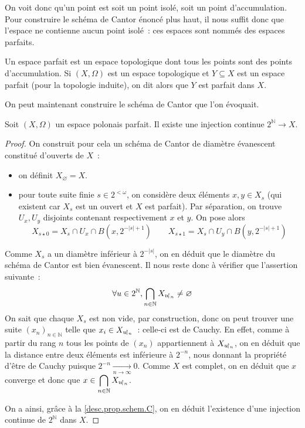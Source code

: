 On voit donc qu'un point est soit un point isolé, soit un point d'accumulation.
Pour construire le schéma de Cantor énoncé plus haut, il nous suffit donc
que l'espace ne contienne aucun point isolé~: ces espaces sont nommés des
espaces parfaits.

\begin{definition}
  Un espace parfait est un espace topologique dont tous les points sont des
  points d'accumulation. Si $(X,\Omega)$ est un espace topologique et
  $Y\subseteq X$ est un espace parfait (pour la topologie induite), on dit alors
  que $Y$ est parfait dans $X$.
\end{definition}

On peut maintenant construire le schéma de Cantor que l'on évoquait.

\begin{proposition}
  Soit $(X,\Omega)$ un espace polonais parfait. Il existe une injection continue
  $2^{\mathbb N} \to X$.
\end{proposition}

\begin{proof}
  On construit pour cela un schéma de Cantor de diamètre évanescent constitué
  d'ouverts de $X$~:
  \begin{itemize}
  \item on définit $X_\varnothing = X$.
  \item pour toute suite finie $s\in 2^{<\omega}$, on considère deux éléments
    $x,y\in X_s$ (qui existent car $X_s$ est un ouvert et $X$ est parfait). Par
    séparation, on trouve $U_x,U_y$ disjoints contenant respectivement $x$ et
    $y$. On pose alors
    \[X_{s\star 0} = X_s\cap U_x \cap B(x,2^{-|s|+1})\qquad
    X_{s\star 1} = X_s\cap U_y \cap B(y,2^{-|s|+1})\]
  \end{itemize}
  Comme $X_s$ a un diamètre inférieur à $2^{-|s|}$, on en déduit que le diamètre
  du schéma de Cantor est bien évanescent. Il nous reste donc à vérifier que
  l'assertion suivante~:
  \[\forall u\in 2^\mathbb N,\bigcap_{n \in \mathbb N}X_{u\!\upharpoonright_{n}}
  \neq\varnothing\]
  On sait que chaque $X_s$ est non vide, par construction, donc on peut trouver
  une suite $(x_n)_{n\in\mathbb N}$ telle que $x_i\in X_{u\!\upharpoonright_{n}}$~: celle-ci
  est de Cauchy. En effet, comme à partir du rang $n$ tous les points de
  $(x_n)$ appartiennent à $X_{u\!\upharpoonright_{n}}$, on en déduit que la distance entre
  deux éléments est inférieure à $2^{-n}$, nous donnant la propriété d'être de
  Cauchy puisque $2^{-n} \xrightarrow[n\to\infty]{} 0$. Comme $X$ est complet,
  on en déduit que $x$ converge et donc que
  $\displaystyle x\in\bigcap_{n\in\mathbb N} X_{u\!\upharpoonright_{n}}$.

  On a ainsi, grâce à la \cref{desc.prop.schem.C}, on en déduit l'existence
  d'une injection continue de $2^\mathbb N$ dans $X$.
\end{proof}

